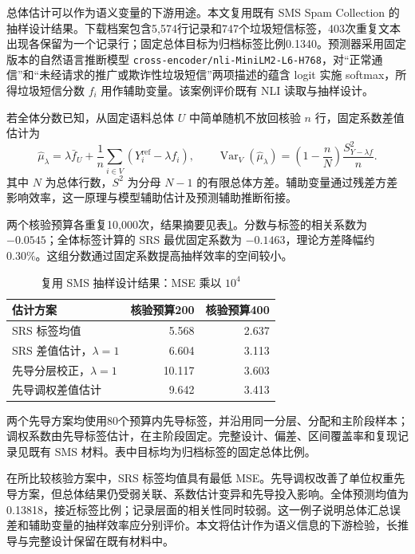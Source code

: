 \documentclass[UTF8,a4paper,zihao=-4,fontset=fandol]{ctexart}
\newcommand{\Var}{\operatorname{Var}}
\begin{document}
总体估计可以作为语义变量的下游用途。本文复用既有 SMS Spam Collection 的抽样设计结果\citep{sms-data}。下载档案包含5,574行记录和747个垃圾短信标签，403次重复文本出现各保留为一个记录行；固定总体目标为归档标签比例0.1340。预测器采用固定版本的自然语言推断模型 \nolinkurl{cross-encoder/nli-MiniLM2-L6-H768}，对“正常通信”和“未经请求的推广或欺诈性垃圾短信”两项描述的蕴含 logit 实施 softmax，所得垃圾短信分数 $f_i$ 用作辅助变量\citep{sms-model}。该案例评价既有 NLI 读取与抽样设计。

若全体分数已知，从固定语料总体 $U$ 中简单随机不放回核验 $n$ 行，固定系数差值估计为
\begin{equation}
 \widehat\mu_\lambda=\lambda\bar f_U+
 \frac1n\sum_{i\in V}(Y_i^{\mathrm{ref}}-\lambda f_i),\qquad
 \Var_V(\widehat\mu_\lambda)=
 \left(1-\frac nN\right)\frac{S^2_{Y-\lambda f}}n.
 \label{eq:sms}
\end{equation}
其中 $N$ 为总体行数，$S^2$ 为分母 $N-1$ 的有限总体方差。辅助变量通过残差方差影响效率，这一原理与模型辅助估计及预测辅助推断衔接\citep{sarndal1992,ppi2023}。

两个核验预算各重复10,000次，结果摘要见表\ref{tab:sms}。分数与标签的相关系数为 $-0.0545$；全体标签计算的 SRS 最优固定系数为 $-0.1463$，理论方差降幅约0.30\%。这组分数通过固定系数提高抽样效率的空间较小。

\begin{table}[htbp]
\centering\small
\caption{复用 SMS 抽样设计结果：MSE 乘以 $10^4$}\label{tab:sms}
\begin{tabular}{@{}lrr@{}}
\toprule
估计方案 & 核验预算200 & 核验预算400 \\
\midrule
SRS 标签均值 & 5.568 & 2.637 \\
SRS 差值估计，$\lambda=1$ & 6.604 & 3.113 \\
先导分层校正，$\lambda=1$ & 10.117 & 3.603 \\
先导调权差值估计 & 9.642 & 3.413 \\
\bottomrule
\end{tabular}
\vspace{0.3em}
\parbox{\textwidth}{\footnotesize 两个先导方案均使用80个预算内先导标签，并沿用同一分层、分配和主阶段样本；调权系数由先导标签估计，在主阶段固定。完整设计、偏差、区间覆盖率和复现记录见既有 SMS 材料。表中目标均为归档标签的固定总体比例。}
\end{table}

在所比较核验方案中，SRS 标签均值具有最低 MSE。先导调权改善了单位权重先导方案，但总体结果仍受弱关联、系数估计变异和先导投入影响。全体预测均值为0.13818，接近标签比例；记录层面的相关性同时较弱。这一例子说明总体汇总误差和辅助变量的抽样效率应分别评价。本文将估计作为语义信息的下游检验，长推导与完整设计保留在既有材料中。
\end{document}
